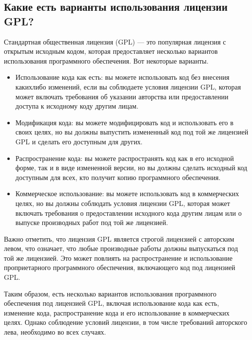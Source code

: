\documentclass[letterpaper,10pt,russian]{sphinxmanual}
\begin{document}
\subsection{Какие есть варианты использования лицензии GPL?}
\label{\detokenize{educational_materials/open_license/content:gpl}}
\sphinxAtStartPar
Стандартная общественная лицензия (GPL) — это популярная лицензия с открытым исходным кодом, которая предоставляет несколько вариантов использования программного обеспечения. Вот некоторые варианты.
\begin{itemize}
\item {} 
\sphinxAtStartPar
Использование кода как есть: вы можете использовать код без внесения каких\sphinxhyphen{}либо изменений, если вы соблюдаете условия лицензии GPL, которая может включать требования об указании авторства или предоставлении доступа к исходному коду другим лицам.

\item {} 
\sphinxAtStartPar
Модификация кода: вы можете модифицировать код и использовать его в своих целях, но вы должны выпустить измененный код под той же лицензией GPL и сделать его доступным для других.

\item {} 
\sphinxAtStartPar
Распространение кода: вы можете распространять код как в его исходной форме, так и в виде измененной версии, но вы должны сделать исходный код доступным для всех, кто получит копию программного обеспечения.

\item {} 
\sphinxAtStartPar
Коммерческое использование: вы можете использовать код в коммерческих целях, но вы должны соблюдать условия лицензии GPL, которая может включать требования о предоставлении исходного кода другим лицам или о выпуске производных работ под той же лицензией.

\end{itemize}

\sphinxAtStartPar
Важно отметить, что лицензия GPL является строгой лицензией с авторским левом, что означает, что любые производные работы должны выпускаться под той же лицензией. Это может повлиять на распространение и использование проприетарного программного обеспечения, включающего код под лицензией GPL.

\sphinxAtStartPar
Таким образом, есть несколько вариантов использования программного обеспечения под лицензией GPL, включая использование кода как есть, изменение кода, распространение кода и его использование в коммерческих целях. Однако соблюдение условий лицензии, в том числе требований авторского лева, необходимо во всех случаях.
\end{document}
